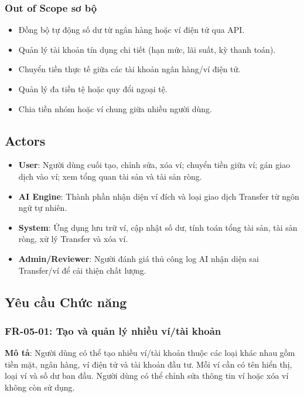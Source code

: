 \subsubsection{Out of Scope sơ bộ}

\begin{itemize}
\item Đồng bộ tự động số dư từ ngân hàng hoặc ví điện tử qua API.
\item Quản lý tài khoản tín dụng chi tiết (hạn mức, lãi suất, kỳ thanh toán).
\item Chuyển tiền thực tế giữa các tài khoản ngân hàng/ví điện tử.
\item Quản lý đa tiền tệ hoặc quy đổi ngoại tệ.
\item Chia tiền nhóm hoặc ví chung giữa nhiều người dùng.
\end{itemize}
\subsection{Actors}

\begin{itemize}
\item \textbf{User}: Người dùng cuối tạo, chỉnh sửa, xóa ví; chuyển tiền giữa ví; gán giao dịch vào ví; xem tổng quan tài sản và tài sản ròng.
\item \textbf{AI Engine}: Thành phần nhận diện ví đích và loại giao dịch Transfer từ ngôn ngữ tự nhiên.
\item \textbf{System}: Ứng dụng lưu trữ ví, cập nhật số dư, tính toán tổng tài sản, tài sản ròng, xử lý Transfer và xóa ví.
\item \textbf{Admin/Reviewer}: Người đánh giá thủ công log AI nhận diện sai Transfer/ví để cải thiện chất lượng.
\end{itemize}
\subsection{Yêu cầu Chức năng}



\subsubsection{FR-05-01: Tạo và quản lý nhiều ví/tài khoản}

\textbf{Mô tả}: Người dùng có thể tạo nhiều ví/tài khoản thuộc các loại khác nhau gồm tiền mặt, ngân hàng, ví điện tử và tài khoản đầu tư. Mỗi ví cần có tên hiển thị, loại ví và số dư ban đầu. Người dùng có thể chỉnh sửa thông tin ví hoặc xóa ví không còn sử dụng.



